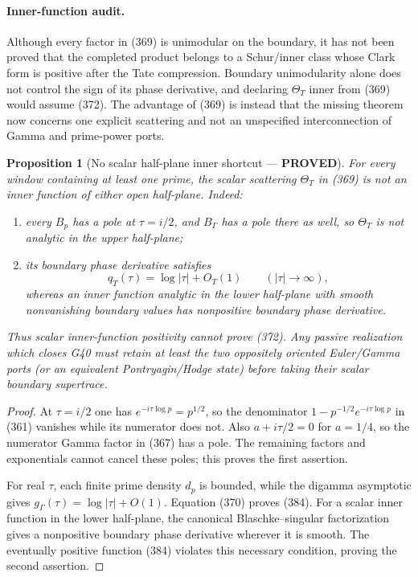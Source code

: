 \documentclass[11pt]{article}
\newtheorem{proposition}[theorem]{Proposition}
\newcommand{\PROVED}{\textcolor{green!45!black}{\textbf{PROVED}}}
\begin{document}
\paragraph{Inner-function audit.}
Although every factor in (369) is unimodular on the boundary, it has not been
proved that the completed product belongs to a Schur/inner class whose Clark
form is positive after the Tate compression.  Boundary unimodularity alone
does not control the sign of its phase derivative, and declaring
$\Theta_T$ inner from (369) would assume (372).  The advantage of (369) is
instead that the missing theorem now concerns one explicit scattering and
not an unspecified interconnection of Gamma and prime-power ports.

\begin{proposition}[No scalar half-plane inner shortcut --- \PROVED]
For every window containing at least one prime, the scalar scattering
$\Theta_T$ in (369) is not an inner function of either open half-plane.
Indeed:
\begin{enumerate}
\item every $B_p$ has a pole at $\tau=i/2$, and $B_\Gamma$ has a pole there
      as well, so $\Theta_T$ is not analytic in the upper half-plane;
\item its boundary phase derivative satisfies
\begin{equation}
 q_T(\tau)=\log|\tau|+O_T(1)\qquad(|\tau|\to\infty),   \tag{384}
\end{equation}
whereas an inner function analytic in the lower half-plane with smooth
nonvanishing boundary values has nonpositive boundary phase derivative.
\end{enumerate}
Thus scalar inner-function positivity cannot prove (372).  Any passive
realization which closes G40 must retain at least the two oppositely oriented
Euler/Gamma ports (or an equivalent Pontryagin/Hodge state) before taking
their scalar boundary supertrace.
\end{proposition}

\begin{proof}
At $\tau=i/2$ one has
$e^{-i\tau\log p}=p^{1/2}$, so the denominator
$1-p^{-1/2}e^{-i\tau\log p}$ in (361) vanishes while its numerator does not.
Also $a+i\tau/2=0$ for $a=1/4$, so the numerator Gamma factor in (367) has
a pole.  The remaining factors and exponentials cannot cancel these poles;
this proves the first assertion.

For real $\tau$, each finite prime density $d_p$ is bounded, while the
digamma asymptotic gives
$g_\Gamma(\tau)=\log|\tau|+O(1)$.  Equation (370) proves (384).
For a scalar inner function in the lower half-plane, the canonical
Blaschke--singular factorization gives a nonpositive boundary phase
derivative wherever it is smooth.  The eventually positive function (384)
violates this necessary condition, proving the second assertion.
\end{proof}
\end{document}
